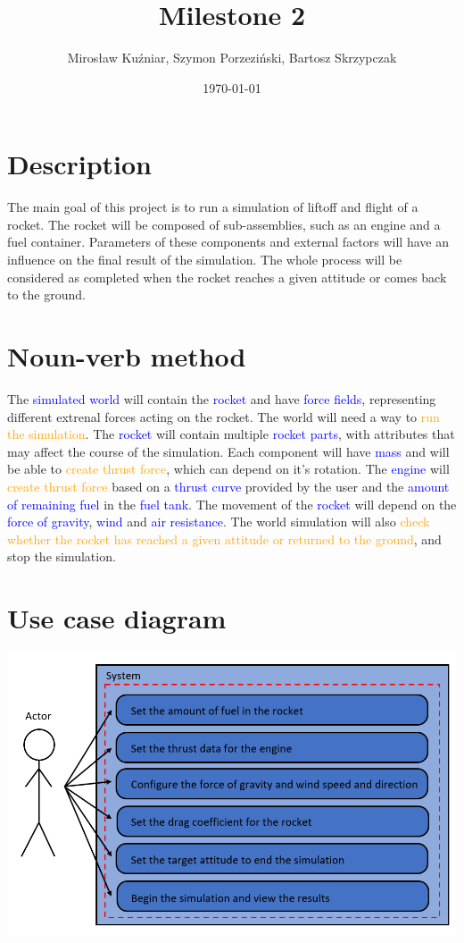 \documentclass{article}
\title{Milestone 2}
\author{Mirosław Kuźniar, Szymon Porzeziński, Bartosz Skrzypczak }
\date{\today}
\begin{document}
\maketitle

\section{Description}
The main goal of this project is to run a simulation of liftoff and flight of a rocket. The rocket will be composed of sub-assemblies, such as an engine and a fuel container. Parameters of these components and external factors will have an influence on the final result of the simulation. The whole process will be considered as completed when the rocket reaches a given attitude or comes back to the ground. 

\section{Noun-verb method}
The \textcolor{blue}{simulated world} will contain the \textcolor{blue}{rocket} and have \textcolor{blue}{force fields}, representing different extrenal forces acting on the rocket. The world will need a way to \textcolor{orange}{run the simulation}. The \textcolor{blue}{rocket} will contain multiple \textcolor{blue}{rocket parts}, with attributes that may affect the course of the simulation. Each component will have \textcolor{blue}{mass} and will be able to \textcolor{orange}{create thrust force}, which can depend on it's rotation. The \textcolor{blue}{engine} will \textcolor{orange}{create thrust force} based on a \textcolor{blue}{thrust curve} provided by the user and the \textcolor{blue}{amount of remaining fuel} in the \textcolor{blue}{fuel tank}. The movement of the \textcolor{blue}{rocket} will depend on the \textcolor{blue}{force of gravity}, \textcolor{blue}{wind} and \textcolor{blue}{air resistance}. The world simulation will also \textcolor{orange}{check whether the rocket has reached a given attitude or returned to the ground}, and stop the simulation.

\section{Use case diagram}
\includegraphics[width=17cm,center]{use_case_diagram.png}
\vspace{5cm}
\end{document}
